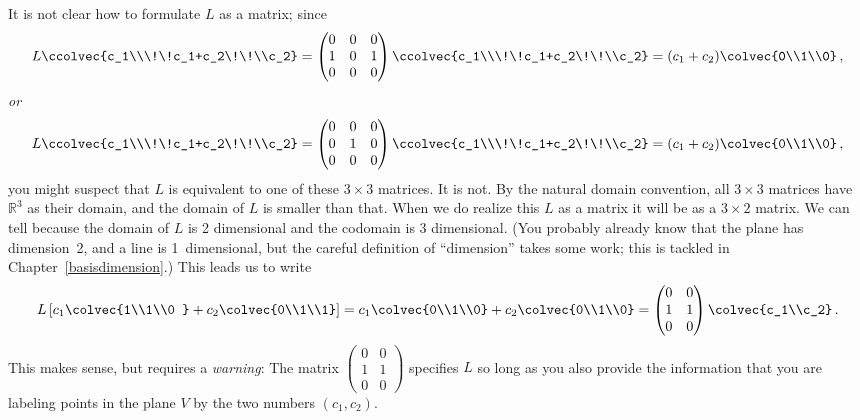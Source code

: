 \begin{example}
It is not clear how to formulate $L$ as a matrix; 
since
\[
L\ccolvec{c_1\\\!\!c_1+c_2\!\!\\c_2} = 
\begin{pmatrix}
0&0&0\\
1&0&1\\
0&0&0
\end{pmatrix}
\ccolvec{c_1\\\!\!c_1+c_2\!\!\\c_2} =(c_1+c_2)\colvec{0\\1\\0}\, ,
\]
{\itshape or} 
\[
L\ccolvec{c_1\\\!\!c_1+c_2\!\!\\c_2} = 
\begin{pmatrix}
0&0&0\\
0&1&0\\
0&0&0
\end{pmatrix}
\ccolvec{c_1\\\!\!c_1+c_2\!\!\\c_2} =(c_1+c_2)\colvec{0\\1\\0}\, ,
\]
you might suspect that  $L$ is equivalent to one of these $3\times3$ matrices. It is not. By the natural domain convention, all $3\times3$ matrices have $\mathbb{R}^3$ as their domain, and the domain of $L$ is smaller than that. 
When we do realize this $L$ as a matrix it will be as a  $3\times2$ matrix. We can tell because the domain of $L$ is 2 dimensional and the codomain is $3$ dimensional. (You probably already know that the plane has dimension~2, and a line is 1~dimensional, but the careful definition of ``dimension'' takes some work; this is tackled in Chapter~\ref{basisdimension}.) This leads us to write
\[
L\left[ c_1\colvec{1\\1\\0 } + c_2 \colvec{0\\1\\1} \right]=c_1\colvec{0\\1\\0}+c_2\colvec{0\\1\\0}=\begin{pmatrix}0&0\\1&1\\0&0\end{pmatrix}\colvec{c_1\\c_2}\, .
\]
This makes sense, but requires a {\itshape warning}: The matrix $\begin{pmatrix}0&0\\1&1\\0&0\end{pmatrix}$ specifies $L$  so long as you also provide the information that you are labeling points in the plane $V$
by the two numbers $(c_1,c_2)$.
\end{example} 





